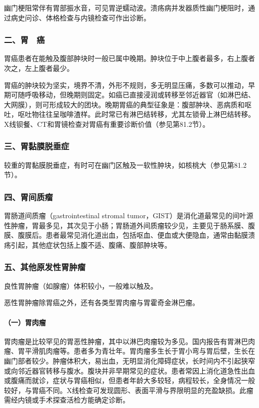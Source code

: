 幽门梗阻常伴有胃部振水音，可见胃逆蠕动波。溃疡病并发器质性幽门梗阻时，通过病史问诊、体格检查与内镜检查可作出诊断。

\subsubsection{二、胃　癌}

胃癌患者在能触及腹部肿块时一般已属中晚期。肿块位于中上腹者最多，右上腹者次之，左上腹者最少。

胃癌的肿块较为坚实，境界不清，外形不规则，多无明显压痛，多数可以推动，早期可随呼吸移动，但晚期则固定。如癌已直接浸润或转移至邻近器官（如淋巴结、大网膜），则可形成较大的团块。晚期胃癌的典型征象是：腹部肿块、恶病质和呕吐，呕吐物往往呈咖啡渣样。此时常已有淋巴结转移，尤其左锁骨上淋巴结转移。X线钡餐、CT和胃镜检查对胃癌有重要诊断价值（参见第81.2节）。

\subsubsection{三、胃黏膜脱垂症}

较重的胃黏膜脱垂症，有时可在幽门区触及一软性肿块，如核桃大（参见第81.2节）。

\subsubsection{四、胃间质瘤}

胃肠道间质瘤（gastrointestinal stromal
tumor，GIST）是消化道最常见的间叶源性肿瘤，胃最多见，其次见于小肠；胃肠道外间质瘤较少见，主要见于肠系膜、腹膜、腹膜后。患者最常见消化道出血，包括呕血、便血或大便隐血，通常由黏膜溃疡引起，其他症状包括上腹不适、腹痛、腹部肿块等。

\subsubsection{五、其他原发性胃肿瘤}

良性胃肿瘤（如腺瘤）体积较小，一般难以触及。

恶性胃肿瘤除胃癌之外，还有各类型胃肉瘤与胃霍奇金淋巴瘤。

\paragraph{（一）胃肉瘤}

胃肉瘤是比较罕见的胃恶性肿瘤，其中以淋巴肉瘤较为多见。国内报告有胃淋巴肉瘤、胃平滑肌肉瘤等。患者多为青壮年。胃肉瘤多生长于胃小弯与胃后壁，生长在幽门部者较少。肿瘤体积大，易出血，无明显消化障碍症状，长时间内不引起狭窄或向邻近器官转移与腹水。腹块并非早期常见的症状。患者常因上消化道急性出血或腹痛而就诊，症状与胃癌相似，但患者年龄大多较轻，病程较长，全身情况一般较好，与胃癌不同。X线检查可发现圆形、表面平滑与界限明显的充盈缺损。此瘤需经内镜或手术探查活检方能确定诊断。

